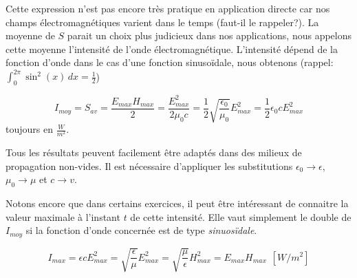 Cette expression n'est pas encore très pratique en application directe car nos champs électromagnétiques varient dans le temps (faut-il le rappeler?). La moyenne de $S$ parait un choix plus judicieux dans nos applications, nous appelons cette moyenne l'intensité de l'onde électromagnétique. L'intensité dépend de la fonction d'onde dans le cas  d'une fonction sinusoïdale, nous obtenons (rappel: $\int_0^{2\pi} \sin^{2}(x) \, dx = \frac{1}{2}$)

\[I_{moy} = S_{av} = \frac{ E_{max} H_{max}}{2} = \frac{E_{max}^{2}}{2\mu_0c} = \frac{1}{2} \sqrt{\frac{\epsilon_0}{\mu_0}} E_{max}^{2} = \frac{1}{2}\epsilon_0 c E_{max}^{2}\]
toujours en $\frac{W}{m^{2}}$.

Tous les résultats peuvent facilement être adaptés dans des milieux de propagation non-vides. Il est nécessaire d'appliquer les substitutions $\epsilon_0 \rightarrow \epsilon$, $\mu_0 \rightarrow \mu$ et $c \rightarrow v $.




Notons encore que dans certains exercices, il peut être intéressant de connaitre la valeur maximale à l'instant $t$ de cette intensité. Elle vaut simplement le double de $I_{moy}$ si la fonction d'onde concernée est de type \textit{sinuosïdale}. 

\[I_{max} = \epsilon c E_{max}^{2} = \sqrt{\frac{\epsilon}{\mu}}E_{max}^{2} = \sqrt{\frac{\mu}{\epsilon}}H_{max}^{2} = E_{max} H_{max} \hspace{5pt} [W/m^{2}]\]




